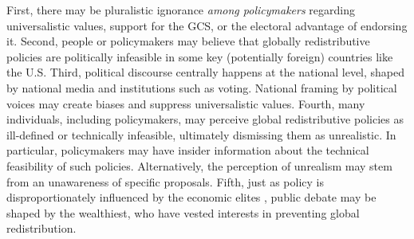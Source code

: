 First, there may be pluralistic ignorance \textit{among policymakers} regarding universalistic values, support for the GCS, or the electoral advantage of endorsing it. Second, people or policymakers may believe that globally redistributive policies are politically infeasible in some key (potentially foreign) countries like the U.S. %
Third, political discourse centrally happens at the national level, shaped by national media and institutions such as voting. 
National framing by political voices may create biases and suppress universalistic values. %
Fourth, many individuals, including policymakers, may perceive global redistributive policies as ill-defined or technically infeasible, ultimately dismissing them as unrealistic. In particular, policymakers may have insider information about the technical feasibility of such policies. Alternatively, the perception of unrealism may stem from an unawareness of specific proposals. %
Fifth, just as policy is disproportionately influenced by the economic elites \citep{gilens_testing_2014,persson_rich_2023}, public debate may be shaped by the wealthiest, who have vested interests in preventing global redistribution.

